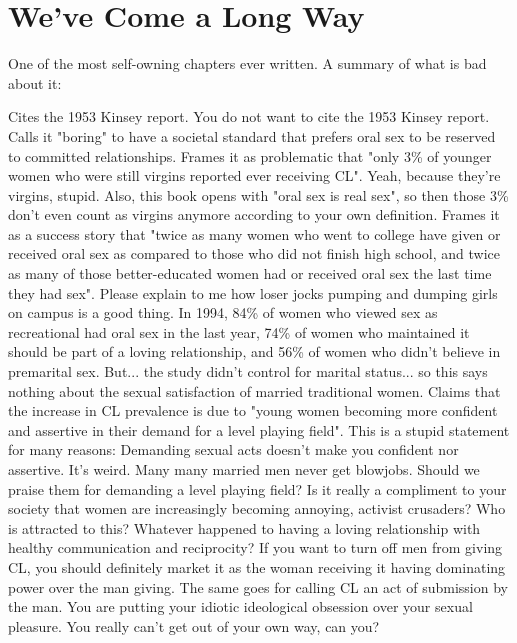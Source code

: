 \section{We've Come a Long Way}
One of the most self-owning chapters ever written. A summary of what is bad about it:
\begin{outline}
\1 Cites the 1953 Kinsey report. You do not want to cite the 1953 Kinsey report.
\1 Calls it "boring" to have a societal standard that prefers oral sex to be reserved to committed relationships.
\1 Frames it as problematic that "only 3\% of younger women who were still virgins reported ever receiving CL". Yeah, because they're virgins, stupid. Also, this book opens with "oral sex is real sex", so then those 3\% don't even count as virgins anymore according to your own definition.
\1 Frames it as a success story that "twice as many women who went to college have given or received oral sex as compared to those who did not finish high school, and twice as many of those better-educated women had or received oral sex the last time they had sex". Please explain to me how loser jocks pumping and dumping girls on campus is a good thing.
\1 In 1994, 84\% of women who viewed sex as recreational had oral sex in the last year, 74\% of women who maintained it should be part of a loving relationship, and 56\% of women who didn't believe in premarital sex. But... the study didn't control for marital status... so this says nothing about the sexual satisfaction of married traditional women.
\1 Claims that the increase in CL prevalence is due to "young women becoming more confident and assertive in their demand for a level playing field". This is a stupid statement for many reasons:
	\2 Demanding sexual acts doesn't make you confident nor assertive. It's weird. Many many married men never get blowjobs. Should we praise them for demanding a level playing field?
	\2 Is it really a compliment to your society that women are increasingly becoming annoying, activist crusaders? Who is attracted to this? Whatever happened to having a loving relationship with healthy communication and reciprocity?
	\2 If you want to turn off men from giving CL, you should definitely market it as the woman receiving it having dominating power over the man giving. The same goes for calling CL an act of submission by the man. You are putting your idiotic ideological obsession over your sexual pleasure. You really can't get out of your own way, can you?
\end{outline}

